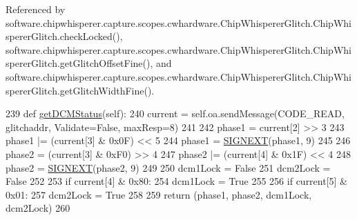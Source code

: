 Referenced by software.\+chipwhisperer.\+capture.\+scopes.\+cwhardware.\+Chip\+Whisperer\+Glitch.\+Chip\+Whisperer\+Glitch.\+check\+Locked(), software.\+chipwhisperer.\+capture.\+scopes.\+cwhardware.\+Chip\+Whisperer\+Glitch.\+Chip\+Whisperer\+Glitch.\+get\+Glitch\+Offset\+Fine(), and software.\+chipwhisperer.\+capture.\+scopes.\+cwhardware.\+Chip\+Whisperer\+Glitch.\+Chip\+Whisperer\+Glitch.\+get\+Glitch\+Width\+Fine().


\begin{DoxyCode}
239     \textcolor{keyword}{def }\hyperlink{classsoftware_1_1chipwhisperer_1_1capture_1_1scopes_1_1cwhardware_1_1ChipWhispererGlitch_1_1ChipWhispererGlitch_ab53e01eeb788534fe53c59904c309fd4}{getDCMStatus}(self):
240         current = self.oa.sendMessage(CODE\_READ, glitchaddr, Validate=\textcolor{keyword}{False}, maxResp=8)
241 
242         phase1 = current[2] >> 3
243         phase1 |= (current[3] & 0x0F) << 5
244         phase1 = \hyperlink{namespacesoftware_1_1chipwhisperer_1_1capture_1_1scopes_1_1cwhardware_1_1ChipWhispererGlitch_ae2bb44739036038b47bd62db2df4b185}{SIGNEXT}(phase1, 9)
245 
246         phase2 = (current[3] & 0xF0) >> 4
247         phase2 |= (current[4] & 0x1F) << 4
248         phase2 = \hyperlink{namespacesoftware_1_1chipwhisperer_1_1capture_1_1scopes_1_1cwhardware_1_1ChipWhispererGlitch_ae2bb44739036038b47bd62db2df4b185}{SIGNEXT}(phase2, 9)
249 
250         dcm1Lock = \textcolor{keyword}{False}
251         dcm2Lock = \textcolor{keyword}{False}
252 
253         \textcolor{keywordflow}{if} current[4] & 0x80:
254             dcm1Lock = \textcolor{keyword}{True}
255 
256         \textcolor{keywordflow}{if} current[5] & 0x01:
257             dcm2Lock = \textcolor{keyword}{True}
258 
259         \textcolor{keywordflow}{return} (phase1, phase2, dcm1Lock, dcm2Lock)
260 
\end{DoxyCode}
\hypertarget{classsoftware_1_1chipwhisperer_1_1capture_1_1scopes_1_1cwhardware_1_1ChipWhispererGlitch_1_1ChipWhispererGlitch_a8b348e1837b1c7688767bc7f745f759b}{}
